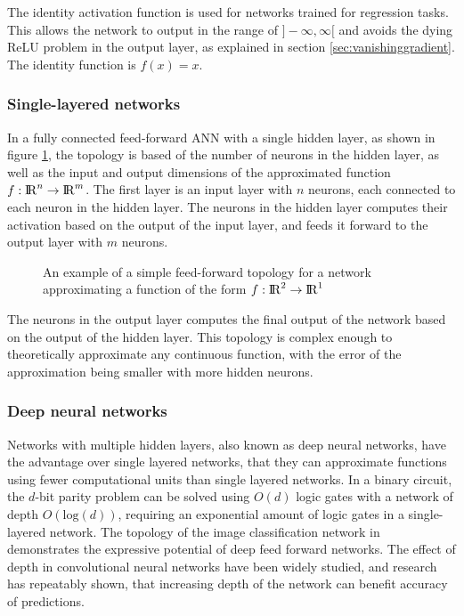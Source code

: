 The identity activation function is used for networks trained for regression tasks. This allows the network to output in the range of $]-\infty,\infty[$ and avoids the dying ReLU problem in the output layer, as explained in section \ref{sec:vanishinggradient}. The identity function is $f(x) = x$.


\subsubsection{Single-layered networks}
In a fully connected feed-forward ANN with a single hidden layer, as shown in figure \ref{fig:fft}, the topology is based of the number of neurons in the hidden layer, as well as the input and output dimensions of the approximated function $f:{\rm I\!R}^n \rightarrow {\rm I\!R}^m$. The first layer is an input layer with $n$ neurons, each connected to each neuron in the hidden layer. The neurons in the hidden layer computes their activation based on the output of the input layer, and feeds it forward to the output layer with $m$ neurons.

\begin{figure}[H]
    \centering
    
    \caption{An example of a simple feed-forward topology for a network approximating a function of the form $f:{\rm I\!R}^2 \rightarrow {\rm I\!R}^1$}
    \label{fig:fft}
\end{figure}

The neurons in the output layer computes the final output of the network based on the output of the hidden layer. This topology is complex enough to theoretically approximate any continuous function, with the error of the approximation being smaller with more hidden neurons.

\subsubsection{Deep neural networks}
Networks with multiple hidden layers, also known as deep neural networks, have the advantage over single layered networks, that they can approximate functions using fewer computational units than single layered networks\cite{yoshua}. In a binary circuit, the $d$-bit parity problem can be solved using $O(d)$ logic gates with a network of depth $O(\text{log}(d))$, requiring an exponential amount of logic gates\cite{Yao} in a single-layered network. The topology of the image classification network in \cite{christian} demonstrates the expressive potential of deep feed forward networks. The effect of depth in convolutional neural networks have been widely studied, and research has repeatably shown, that increasing depth of the network can benefit accuracy of predictions\cite{karen}.

